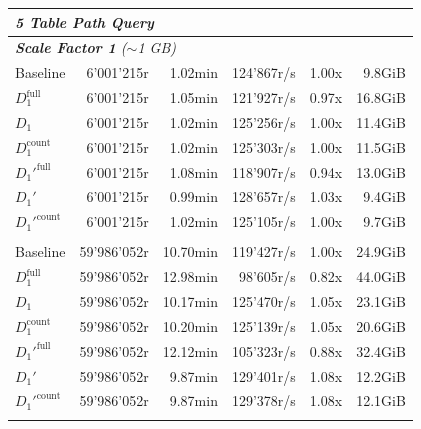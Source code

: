 \begin{longtable}{lrrrrr}
    \multicolumn{6}{l}{\textit{5 Table Path Query}} \\
    \midrule
    \multicolumn{6}{l}{\textit{\textbf{Scale Factor 1} ($\sim$1 GB)}} \\
    \nopagebreak
    Baseline              &  6'001'215r           &  1.02min             &  124'867r/s          & 1.00x             & 9.8GiB    \\
    $D_1^{\text{full}}$   &  6'001'215r           &  1.05min             &  121'927r/s          & 0.97x             & 16.8GiB   \\
    \quad $D_1$           &  6'001'215r           &  1.02min             &  125'256r/s          & 1.00x             & 11.4GiB   \\
    $D_1^{\text{count}}$  &  6'001'215r           &  1.02min             &  125'303r/s          & 1.00x             & 11.5GiB   \\
    $D_1'^{\text{full}}$  &  6'001'215r           &  1.08min             &  118'907r/s          & 0.94x             & 13.0GiB   \\
    \quad $D_1'$          &  6'001'215r           &  0.99min             &  128'657r/s          & 1.03x             & 9.4GiB    \\
    $D_1'^{\text{count}}$ &  6'001'215r           &  1.02min             &  125'105r/s          & 1.00x             & 9.7GiB    \\
    \addlinespace
    
    \multicolumn{6}{l}{\textit{\textbf{Scale Factor 10} ($\sim$10 GB)}} \\
    \nopagebreak
    Baseline              &  59'986'052r          &  10.70min            &  119'427r/s          & 1.00x             & 24.9GiB   \\
    $D_1^{\text{full}}$   &  59'986'052r          &  12.98min            &  98'605r/s           & 0.82x             & 44.0GiB   \\
    \quad $D_1$           &  59'986'052r          &  10.17min            &  125'470r/s          & 1.05x             & 23.1GiB   \\
    $D_1^{\text{count}}$  &  59'986'052r          &  10.20min            &  125'139r/s          & 1.05x             & 20.6GiB   \\
    $D_1'^{\text{full}}$  &  59'986'052r          &  12.12min            &  105'323r/s           & 0.88x             & 32.4GiB   \\
    \quad $D_1'$          &  59'986'052r          &  9.87min             &  129'401r/s          & 1.08x             & 12.2GiB   \\
    $D_1'^{\text{count}}$ &  59'986'052r          &  9.87min            &  129'378r/s          & 1.08x             & 12.1GiB   \\
    \addlinespace


\end{longtable}
